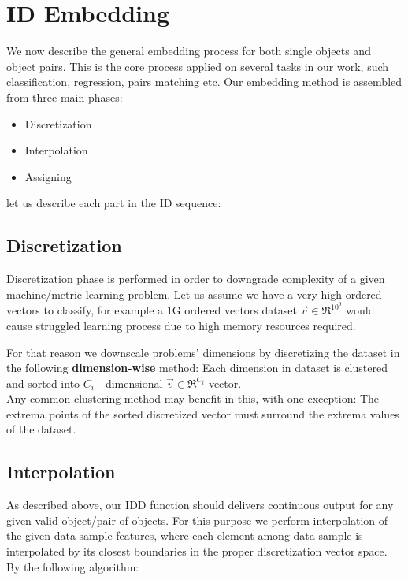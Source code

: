 
\chapter{ID Embedding} %

\label{Chapter2} %

We now describe the general embedding process for both single objects and object pairs. This is the core process applied on several tasks in our work, such classification, regression, pairs matching etc.
Our embedding method is assembled from three main phases:

\begin{itemize}
	\item Discretization
	\item Interpolation
	\item Assigning
\end{itemize}

let us describe each part in the ID sequence:

\section{Discretization}
Discretization phase is performed in order to downgrade complexity of a given machine/metric learning problem. 
Let us assume we have a very high ordered vectors to classify, for example a 1G ordered vectors dataset $\overrightarrow{v} \in \Re^{10^9}$ would cause struggled learning process due to high memory resources required.

For that reason we downscale problems’ dimensions by discretizing the dataset in the following \textbf{dimension-wise} method:
Each dimension in dataset is clustered and sorted into $C_i$ - dimensional $\overrightarrow{v} \in \Re^{C_i}$ vector.\\
Any common clustering method may benefit in this, with one exception:
The extrema points of the sorted discretized vector must surround the extrema values of the dataset.

\section{Interpolation}

As described above, our IDD function should delivers continuous output for any given valid object/pair of objects. 
For this purpose we perform interpolation of the given data sample features, where each element among data sample is interpolated by its closest boundaries in the proper discretization vector space. By the following algorithm:

